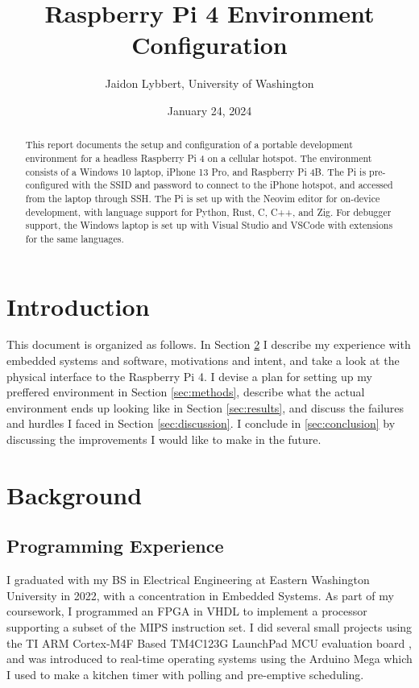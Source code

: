 \documentclass[12pt]{article}
\begin{document}
\title{Raspberry Pi 4 Environment Configuration}
\author{Jaidon Lybbert, University of Washington}
\date{January 24, 2024}

\maketitle

\begin{abstract}
This report documents the setup and configuration of a portable development environment for a headless Raspberry Pi 4 on a cellular hotspot. The environment consists of a Windows 10 laptop, iPhone 13 Pro, and Raspberry Pi 4B. The Pi is pre-configured with the SSID and password to connect to the iPhone hotspot, and accessed from the laptop through SSH. The Pi is set up with the Neovim editor for on-device development, with language support for Python, Rust, C, C++, and Zig. For debugger support, the Windows laptop is set up with Visual Studio and VSCode with extensions for the same languages.
\end{abstract}

\section{Introduction}
This document is organized as follows. In Section \ref{sec:background} I describe my experience with embedded systems and software, motivations and intent, and take a look at the physical interface to the Raspberry Pi 4. I devise a plan for setting up my preffered environment in Section \ref{sec:methods}, describe what the actual environment ends up looking like in Section \ref{sec:results}, and discuss the failures and hurdles I faced in Section \ref{sec:discussion}. I conclude in \ref{sec:conclusion} by discussing the improvements I would like to make in the future.

\section{Background}\label{sec:background}
\subsection{Programming Experience}
I graduated with my BS in Electrical Engineering at Eastern Washington University in 2022, with a concentration in Embedded Systems. As part of my coursework, I programmed an FPGA in VHDL to implement a processor supporting a subset of the MIPS instruction set. I did several small projects using the TI ARM\textregistered{} Cortex\textregistered-M4F Based TM4C123G LaunchPad\texttrademark{} MCU evaluation board \cite{ti_ek_tm4c123gxl}, and was introduced to real-time operating systems using the Arduino Mega which I used to make a kitchen timer\cite{lybbert2023} with polling and pre-emptive scheduling.
\end{document}
